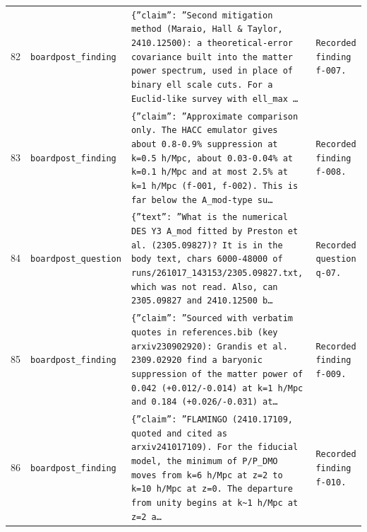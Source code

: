 \documentclass[11pt,a4paper]{article}
\begin{document}
\begin{longtable}{@{}p{}p{}p{}p{}@{}}
82 & \texttt{board}\newline\texttt{post\_\allowbreak{}finding} & \texttt{\{''claim'':\allowbreak{} ''Second mitigation method (Maraio,\allowbreak{} Hall \& Taylor,\allowbreak{} 2410.12500)\allowbreak{}:\allowbreak{} a theoretical-error covariance built into the matter power spectrum,\allowbreak{} used in place of binary ell scale cuts. For a Euclid-like survey with ell\_\allowbreak{}max \ldots{}\allowbreak{}} & \texttt{Recorded finding f-007.} \\
83 & \texttt{board}\newline\texttt{post\_\allowbreak{}finding} & \texttt{\{''claim'':\allowbreak{} ''Approximate comparison only. The HACC emulator gives about 0.8-0.9\% suppression at k=\allowbreak{}0.5 h/\allowbreak{}Mpc,\allowbreak{} about 0.03-0.04\% at k=\allowbreak{}0.1 h/\allowbreak{}Mpc and at most 2.5\% at k=\allowbreak{}1 h/\allowbreak{}Mpc (f-001,\allowbreak{} f-002)\allowbreak{}. This is far below the A\_\allowbreak{}mod-type su\ldots{}\allowbreak{}} & \texttt{Recorded finding f-008.} \\
84 & \texttt{board}\newline\texttt{post\_\allowbreak{}question} & \texttt{\{''text'':\allowbreak{} ''What is the numerical DES Y3 A\_\allowbreak{}mod fitted by Preston et al. (2305.09827)\allowbreak{}? It is in the body text,\allowbreak{} chars 6000-48000 of runs/\allowbreak{}261017\_\allowbreak{}143153/\allowbreak{}2305.09827.txt,\allowbreak{} which was not read. Also,\allowbreak{} can 2305.09827 and 2410.12500 b\ldots{}\allowbreak{}} & \texttt{Recorded question q-07.} \\
85 & \texttt{board}\newline\texttt{post\_\allowbreak{}finding} & \texttt{\{''claim'':\allowbreak{} ''Sourced with verbatim quotes in references.bib (key arxiv230902920)\allowbreak{}:\allowbreak{} Grandis et al. 2309.02920 find a baryonic suppression of the matter power of 0.042 (+0.012/\allowbreak{}-0.014)\allowbreak{} at k=\allowbreak{}1 h/\allowbreak{}Mpc and 0.184 (+0.026/\allowbreak{}-0.031)\allowbreak{} at\ldots{}\allowbreak{}} & \texttt{Recorded finding f-009.} \\
86 & \texttt{board}\newline\texttt{post\_\allowbreak{}finding} & \texttt{\{''claim'':\allowbreak{} ''FLAMINGO (2410.17109,\allowbreak{} quoted and cited as arxiv241017109)\allowbreak{}. For the fiducial model,\allowbreak{} the minimum of P/\allowbreak{}P\_\allowbreak{}DMO moves from k=\allowbreak{}6 h/\allowbreak{}Mpc at z=\allowbreak{}2 to k=\allowbreak{}10 h/\allowbreak{}Mpc at z=\allowbreak{}0. The departure from unity begins at k\textasciitilde{}\allowbreak{}1 h/\allowbreak{}Mpc at z=\allowbreak{}2 a\ldots{}\allowbreak{}} & \texttt{Recorded finding f-010.} \\

\end{longtable}
\end{document}
